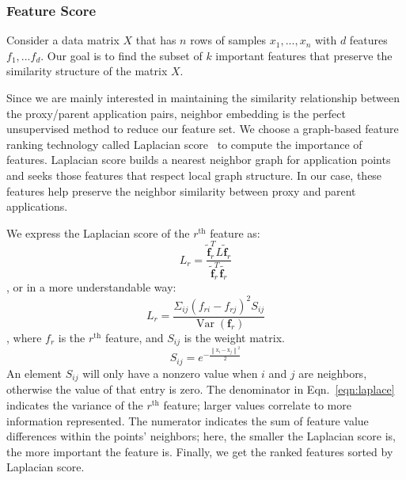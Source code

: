 \subsubsection{Feature Score}
\label{sec:feature_score}
Consider a data matrix $X$ that has $n$ rows of samples $x_{1},...,x_{n}$ with $d$ features $f_{1},...f_{d}$. Our goal is to find the subset of $k$ important features that preserve the similarity structure of the matrix $X$. 

Since we are mainly interested in maintaining the similarity relationship between the proxy/parent application pairs, neighbor embedding is the perfect unsupervised method to reduce our feature set. We choose a graph-based feature ranking technology called Laplacian score~\cite{he2005laplacian} to compute the importance of features.  Laplacian score builds a nearest neighbor graph for application points and seeks those features that respect local graph structure. In our case, these features help preserve the neighbor similarity between proxy and parent applications.  

We express the Laplacian score of the $r^\textrm{th}$ feature as:
\begin{equation}L_{r}=\frac{\widetilde{\mathbf{f}}_{r}^{T} L \widetilde{\mathbf{f}}_{r}}{\widetilde{\mathbf{f}}_{r}^{T} \widetilde{\mathbf{f}_{r}}}
\end{equation}
, or in a more understandable way:
\begin{equation}
\label{eqn:laplace}
L_{r}=\frac{\Sigma_{i j}\left(f_{r i}-f_{r j}\right)^{2} S_{i j}}{\operatorname{Var}\left(\mathbf{f}_{r}\right)}
\end{equation} , where $f_r$ is the $r^\textrm{th}$ feature, and $S_{i j}$ is the weight matrix.  
\begin{equation}S_{i j}=e^{-\frac{\left\|\mathrm{x}_{i}-\mathrm{x}_{j}\right\|^{2}}{2}}\end{equation}
An element $S_{i j}$ will only have a nonzero value when $i$ and $j$ are neighbors, otherwise the value of that entry is zero. The denominator in Eqn.~\ref{eqn:laplace} indicates the variance of the $r^\textrm{th}$ feature; larger values correlate to more information represented. The numerator indicates the sum of feature value differences within the points' neighbors; here, the smaller the Laplacian score is, the more important the feature is. Finally, we get the ranked features sorted by Laplacian score.

